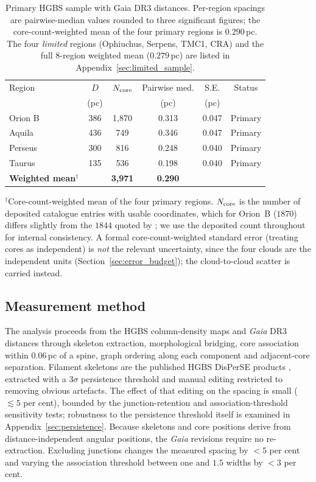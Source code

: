 \documentclass[usenatbib,twoside,twocolumn]{mnras}
\begin{document}
\begin{table}
\caption{Primary HGBS sample with Gaia DR3 distances. Per-region spacings are pairwise-median values rounded to three significant figures; the core-count-weighted mean of the four primary regions is $0.290$\,pc. The four \emph{limited} regions (Ophiuchus, Serpens, TMC1, CRA) and the full 8-region weighted mean ($0.279$\,pc) are listed in Appendix~\ref{sec:limited_sample}.}
\label{tab:sample}
\footnotesize
\setlength{\tabcolsep}{3pt}
\begin{tabular}{lccccc}
\toprule
Region & $D$ & $N_{\rm core}$ & Pairwise med. & S.E. & Status \\
       & (pc) &  & (pc) & (pc) &  \\
\midrule
Orion B  & 386 & 1,870 & 0.313 & 0.047 & Primary \\
Aquila   & 436 & 749   & 0.346 & 0.047 & Primary \\
Perseus  & 300 & 816   & 0.248 & 0.040 & Primary \\
Taurus   & 135 & 536   & 0.198 & 0.040 & Primary \\
\midrule
\textbf{Weighted mean}$^\dagger$ &  & \textbf{3,971} & \textbf{0.290} & &  \\
\bottomrule
\end{tabular}
\par\vspace{2pt}
\footnotesize $^\dagger$Core-count-weighted mean of the four primary regions. $N_{\rm core}$ is the number of deposited catalogue entries with usable coordinates, which for Orion~B ($1870$) differs slightly from the $1844$ quoted by \citet{Konyves2020}; we use the deposited count throughout for internal consistency. A formal core-count-weighted standard error (treating cores as independent) is \emph{not} the relevant uncertainty, since the four clouds are the independent units (Section~\ref{sec:error_budget}); the cloud-to-cloud scatter is carried instead.
\end{table}

\subsection{Measurement method}
\label{sec:methodology}

The analysis proceeds from the HGBS column-density maps and \textit{Gaia} DR3 distances through skeleton extraction, morphological bridging, core association within $0.06$\,pc of a spine, graph ordering along each component and adjacent-core separation. Filament skeletons are the published HGBS DisPerSE products \citep{Sousbie2011,Arzoumanian2011}, extracted with a $3\sigma$ persistence threshold and manual editing restricted to removing obvious artefacts. The effect of that editing on the spacing is small ($\lesssim5$ per cent), bounded by the junction-retention and association-threshold sensitivity tests; robustness to the persistence threshold itself is examined in Appendix~\ref{sec:persistence}. Because skeletons and core positions derive from distance-independent angular positions, the \textit{Gaia} revisions require no re-extraction. Excluding junctions changes the measured spacing by $<5$ per cent and varying the association threshold between one and $1.5$ widths by $<3$ per cent.
\end{document}
